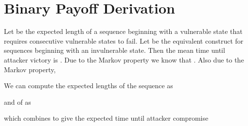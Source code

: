\documentclass{acm_proc_article-sp}
\begin{document}
\newpage

\appendix
\section{Binary Payoff Derivation}
\label{derivation}
Let 
be the expected length of a sequence beginning with a vulnerable state
that requires  consecutive vulnerable states to fail. Let 
be the equivalent construct for sequences beginning with an invulnerable
state. Then the mean time until attacker victory is .
Due to the Markov property we know that .
Also due to the Markov property, 

We can compute the expected lengths of the sequence 
as


and of  as 

 which combines to give the expected time until attacker compromise
{\small

}



\end{document}
